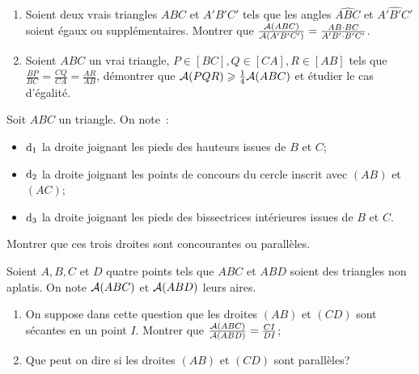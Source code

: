 \begin{exercice}
  \begin{enumerate}
    \item Soient deux vrais triangles \(ABC\) et \(A'B'C'\)
      tels que les angles \(\widehat{ABC}\) et
      \(\widehat{A'B'C'}\) soient égaux ou supplémentaires.
      Montrer que \(\frac{\mathcal{A}(ABC)}{\mathcal{A}(A'B'C')} = \frac{AB
      \cdot BC}{A'B' \cdot B'C'}\).
    \item Soient \(ABC\) un vrai triangle, \(P \in [BC], Q \in
      [CA], R \in [AB]\) tels que \(\frac{BP}{BC} =
      \frac{CQ}{CA} = \frac{AR}{AB}\), démontrer que \(\mathcal{A}(PQR)
      \geqslant \frac{1}{4} \mathcal{A}(ABC)\) et étudier le cas
      d'égalité.
  \end{enumerate}
\end{exercice}

\begin{exercice}
  Soit \(ABC\) un triangle. On note~:
  \begin{itemize}
    \item \(\mathrm{d}_1\) la droite joignant les pieds des hauteurs
      issues de \(B\) et \(C\);
    \item \(\mathrm{d}_2\) la droite joignant les points de concours
      du cercle inscrit avec \((AB)\) et \((AC)\);
    \item \(\mathrm{d}_3\) la droite joignant les pieds des
      bissectrices intérieures issues de \(B\) et \(C\).
  \end{itemize}
  Montrer que ces trois droites sont concourantes ou
  parallèles.
\end{exercice}

\begin{exercice}
  Soient \(A, B, C\) et \(D\) quatre points tels que \(ABC\)
  et \(ABD\) soient des triangles non aplatis. On note
  \(\mathcal{A}(ABC)\) et \(\mathcal{A}(ABD)\) leurs aires.
  \begin{enumerate}
    \item On suppose dans cette question que les droites
      \((AB)\) et \((CD)\) sont sécantes en un point \(I\).
      Montrer que \(\frac{\mathcal{A}(ABC)}{\mathcal{A}(ABD)} = \frac{CI}{DI}\);
    \item Que peut on dire si les droites \((AB)\) et \((CD)\)
      sont parallèles?
  \end{enumerate}
\end{exercice}
